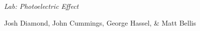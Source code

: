{\LARGE {\em \noindent Lab: Photoelectric Effect}}

\large{\noindent Josh Diamond, John Cummings, George Hassel, \& Matt Bellis}

